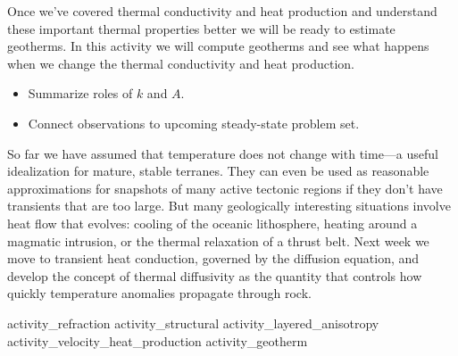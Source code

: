 
Once we've covered thermal conductivity and heat production and understand these important thermal properties better we will be ready to estimate geotherms.  In this activity we will compute geotherms and see what happens when we change the thermal conductivity and heat production.


\begin{itemize}
  \item Summarize roles of $k$ and $A$.
  \item Connect observations to upcoming steady-state problem set.
\end{itemize}


So far we have assumed that temperature does not change with time---a useful idealization for mature, stable terranes. They can even be used as reasonable approximations for snapshots of many active tectonic regions if they don't have transients that are too large.  But many geologically interesting situations involve heat flow that evolves: cooling of the oceanic lithosphere, heating around a magmatic intrusion, or the thermal relaxation of a thrust belt. Next week we move to transient heat conduction, governed by the diffusion equation, and develop the concept of thermal diffusivity as the quantity that controls how quickly temperature anomalies propagate through rock.

\workshopend
\notepage
\notepage

{activity_refraction}
{activity_structural}
{activity_layered_anisotropy}
{activity_velocity_heat_production}
{activity_geotherm}